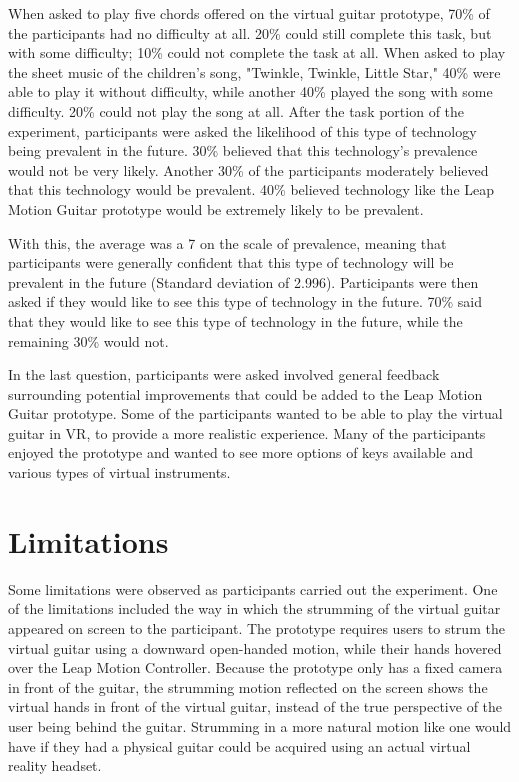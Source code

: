 \documentclass{vgtc}                          %
\begin{document}
When asked to play five chords offered on the virtual guitar prototype, 70\% of the participants had no difficulty at all. 20\% could still complete this task, but with some difficulty; 10\% could not complete the task at all. When asked to play the sheet music of the children's song, "Twinkle, Twinkle, Little Star," 40\% were able to play it without difficulty, while another 40\% played the song with some difficulty. 20\% could not play the song at all. After the task portion of the experiment, participants were asked the likelihood of this type of technology being prevalent in the future. 30\% believed that this technology's prevalence would not be very likely. Another 30\% of the participants moderately believed that this technology would be prevalent. 40\% believed technology like the Leap Motion Guitar prototype would be extremely likely to be prevalent. 

With this, the average was a 7 on the scale of prevalence, meaning that participants were generally confident that this type of technology will be prevalent in the future (Standard deviation of 2.996). Participants were then asked if they would like to see this type of technology in the future. 70\% said that they would like to see this type of technology in the future, while the remaining 30\% would not.

In the last question, participants were asked involved general feedback surrounding potential improvements that could be added to the Leap Motion Guitar prototype. Some of the participants wanted to be able to play the virtual guitar in VR, to provide a more realistic experience. Many of the participants enjoyed the prototype and wanted to see more options of keys available and various types of virtual instruments. 

\section{Limitations}
Some limitations were observed as participants carried out the experiment. One of the limitations included the way in which the strumming of the virtual guitar appeared on screen to the participant. The prototype requires users to strum the virtual guitar using a downward open-handed motion, while their hands hovered over the Leap Motion Controller.  Because the prototype only has a fixed camera in front of the guitar, the strumming motion reflected on the screen shows the virtual hands in front of the virtual guitar, instead of the true perspective of the user being behind the guitar.  Strumming in a more natural motion like one would have if they had a physical guitar could be acquired using an actual virtual reality headset.
\end{document}
